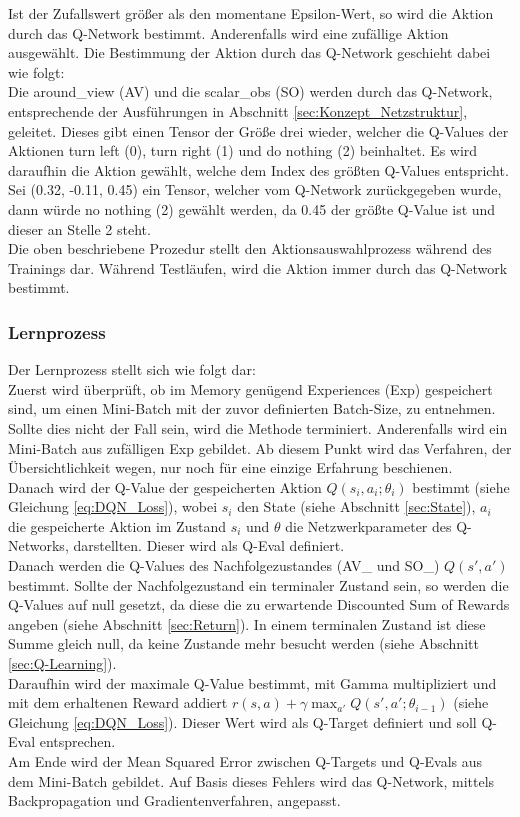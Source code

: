 Ist der Zufallswert größer als den momentane Epsilon-Wert, so wird die Aktion durch das Q-Network bestimmt. Anderenfalls wird eine zufällige Aktion ausgewählt. Die Bestimmung der Aktion durch das Q-Network geschieht dabei wie folgt:\\
Die around\_view (AV) und die scalar\_obs (SO) werden durch das Q-Network, entsprechende der Ausführungen in Abschnitt \ref{sec:Konzept_Netzstruktur}, geleitet. Dieses gibt einen Tensor der Größe drei wieder, welcher die Q-Values der Aktionen turn left (0), turn right (1) und do nothing (2) beinhaltet.
Es wird daraufhin die Aktion gewählt, welche dem Index des größten Q-Values entspricht.\\
Sei (0.32, -0.11, 0.45) ein Tensor, welcher vom Q-Network zurückgegeben wurde, dann würde no nothing (2) gewählt werden, da 0.45 der größte Q-Value ist und dieser an Stelle 2 steht.\\
Die oben beschriebene Prozedur stellt den Aktionsauswahlprozess während des Trainings dar. Während Testläufen, wird die Aktion immer durch das Q-Network bestimmt.

\subsubsection{Lernprozess} \label{sec:Konzept_Lernprozess_DQN}
Der Lernprozess stellt sich wie folgt dar:\\
Zuerst wird überprüft, ob im Memory genügend Experiences (Exp) gespeichert sind, um einen Mini-Batch mit der zuvor definierten Batch-Size, zu entnehmen. Sollte dies nicht der Fall sein, wird die Methode terminiert. Anderenfalls wird ein Mini-Batch aus zufälligen Exp gebildet. Ab diesem Punkt wird das Verfahren, der Übersichtlichkeit wegen, nur noch für eine einzige Erfahrung beschienen.\\
Danach wird der Q-Value der gespeicherten Aktion $Q(s_i,a_i;\theta_i)$ bestimmt (siehe Gleichung \ref{eq:DQN_Loss}), wobei $s_i$ den State (siehe Abschnitt \ref{sec:State}), $a_i$ die gespeicherte Aktion im Zustand $s_i$ und $\theta$ die Netzwerkparameter des Q-Networks, darstellten. Dieser wird als Q-Eval definiert.\\
Danach werden die Q-Values des Nachfolgezustandes (AV\_ und SO\_) $Q(s',a')$ bestimmt. Sollte der Nachfolgezustand ein terminaler Zustand sein, so werden die Q-Values auf null gesetzt, da diese die zu erwartende Discounted Sum of Rewards angeben (siehe Abschnitt \ref{sec:Return}). In einem terminalen Zustand ist diese Summe gleich null, da keine Zustande mehr besucht werden (siehe Abschnitt \ref{sec:Q-Learning}).\\
Daraufhin wird der maximale Q-Value bestimmt, mit Gamma multipliziert und mit dem erhaltenen Reward addiert $r(s,a) + \gamma \max_{a'}Q(s',a';\theta_{i-1})$ (siehe Gleichung \ref{eq:DQN_Loss}). Dieser Wert wird als Q-Target definiert und soll Q-Eval entsprechen.\\
Am Ende wird der Mean Squared Error zwischen Q-Targets und Q-Evals aus dem Mini-Batch gebildet. Auf Basis dieses Fehlers wird das Q-Network, mittels Backpropagation und Gradientenverfahren, angepasst.

